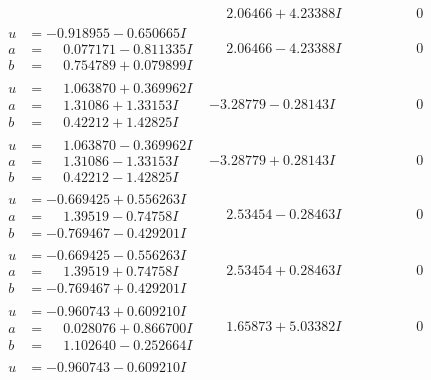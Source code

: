 \documentclass[1p]{elsarticle_modified}
\theoremstyle{definition}
\begin{document}
$$\begin{array}{c|c|c}
 & \phantom{-}2.06466 + 4.23388 I & \phantom{-0.000000 } 0 \\ \hline\begin{aligned}
u &= -0.918955 - 0.650665 I \\
a &= \phantom{-}0.077171 - 0.811335 I \\
b &= \phantom{-}0.754789 + 0.079899 I\end{aligned}
 & \phantom{-}2.06466 - 4.23388 I & \phantom{-0.000000 } 0 \\ \hline\begin{aligned}
u &= \phantom{-}1.063870 + 0.369962 I \\
a &= \phantom{-}1.31086 + 1.33153 I \\
b &= \phantom{-}0.42212 + 1.42825 I\end{aligned}
 & -3.28779 - 0.28143 I & \phantom{-0.000000 } 0 \\ \hline\begin{aligned}
u &= \phantom{-}1.063870 - 0.369962 I \\
a &= \phantom{-}1.31086 - 1.33153 I \\
b &= \phantom{-}0.42212 - 1.42825 I\end{aligned}
 & -3.28779 + 0.28143 I & \phantom{-0.000000 } 0 \\ \hline\begin{aligned}
u &= -0.669425 + 0.556263 I \\
a &= \phantom{-}1.39519 - 0.74758 I \\
b &= -0.769467 - 0.429201 I\end{aligned}
 & \phantom{-}2.53454 - 0.28463 I & \phantom{-0.000000 } 0 \\ \hline\begin{aligned}
u &= -0.669425 - 0.556263 I \\
a &= \phantom{-}1.39519 + 0.74758 I \\
b &= -0.769467 + 0.429201 I\end{aligned}
 & \phantom{-}2.53454 + 0.28463 I & \phantom{-0.000000 } 0 \\ \hline\begin{aligned}
u &= -0.960743 + 0.609210 I \\
a &= \phantom{-}0.028076 + 0.866700 I \\
b &= \phantom{-}1.102640 - 0.252664 I\end{aligned}
 & \phantom{-}1.65873 + 5.03382 I & \phantom{-0.000000 } 0 \\ \hline\begin{aligned}
u &= -0.960743 - 0.609210 I \\

\end{aligned}
\end{array}$$
\end{document}
